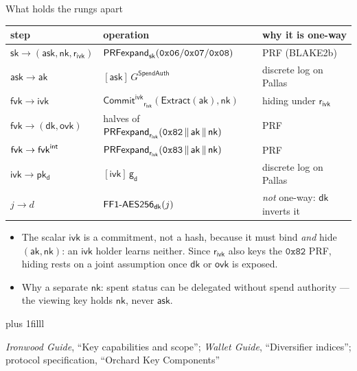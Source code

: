 \documentclass[aspectratio=169,11pt]{beamer}
\newcommand{\gd}{\ensuremath{\mathsf{g_d}}}
\newcommand{\pkd}{\ensuremath{\mathsf{pk_d}}}
\newcommand{\aksym}{\ensuremath{\mathsf{ak}}}
\newcommand{\nksym}{\ensuremath{\mathsf{nk}}}
\newcommand{\asksym}{\ensuremath{\mathsf{ask}}}
\newcommand{\ivk}{\ensuremath{\mathsf{ivk}}}
\newcommand{\fvk}{\ensuremath{\mathsf{fvk}}}
\newcommand{\ovk}{\ensuremath{\mathsf{ovk}}}
\newcommand{\dk}{\ensuremath{\mathsf{dk}}}
\newcommand{\rivk}{\ensuremath{\mathsf{r_{ivk}}}}
\newcommand{\Extract}{\ensuremath{\mathsf{Extract}}}
\newcommand{\CommitIvk}{\ensuremath{\mathsf{Commit}^{\mathsf{ivk}}}}
\newcommand{\src}[1]{\par\vskip0pt plus 1filll
  {\fontsize{6}{7.2}\selectfont\color{arbdim}\raggedright #1\par}}
\begin{document}
\begin{frame}{What holds the rungs apart}
\begin{center}\small
\begin{tabular}{@{}lll@{}}
\toprule
step & operation & why it is one-way \\
\midrule
$\mathsf{sk} \to (\asksym, \nksym, \rivk)$
  & $\mathsf{PRFexpand}_{\mathsf{sk}}(\mathtt{0x06}/\mathtt{0x07}/\mathtt{0x08})$
  & PRF (BLAKE2b) \\
$\asksym \to \aksym$
  & $[\asksym]\,G^{\mathsf{SpendAuth}}$
  & discrete log on Pallas \\
$\fvk \to \ivk$
  & $\CommitIvk_{\rivk}(\Extract(\aksym), \nksym)$
  & hiding under \rivk \\
$\fvk \to (\dk, \ovk)$
  & halves of $\Dprf{\rivk}(\mathtt{0x82}\,\|\,\aksym\,\|\,\nksym)$
  & PRF \\
$\fvk \to \Dint{\fvk}$
  & $\Dprf{\rivk}(\mathtt{0x83}\,\|\,\aksym\,\|\,\nksym)$
  & PRF \\
$\ivk \to \pkd$
  & $[\ivk]\,\gd$
  & discrete log on Pallas \\
$j \to d$
  & $\Dff_{\dk}(j)$
  & \emph{not} one-way: \dk{} inverts it \\
\bottomrule
\end{tabular}
\end{center}
\begin{itemize}
  \item The scalar \ivk{} is a commitment, not a hash, because it must bind
    \emph{and} hide $(\aksym, \nksym)$: an \ivk{} holder learns neither.
    Since \rivk{} also keys the $\mathtt{0x82}$ PRF, hiding rests on a
    joint assumption once \dk{} or \ovk{} is exposed.
  \item Why a separate \nksym: spent status can be delegated without
    spend authority --- the viewing key holds \nksym, never \asksym.
\end{itemize}
\src{\emph{Ironwood Guide}, ``Key capabilities and scope''; \emph{Wallet Guide},
``Diversifier indices''; protocol specification, ``Orchard Key
Components''}
\end{frame}
\end{document}

